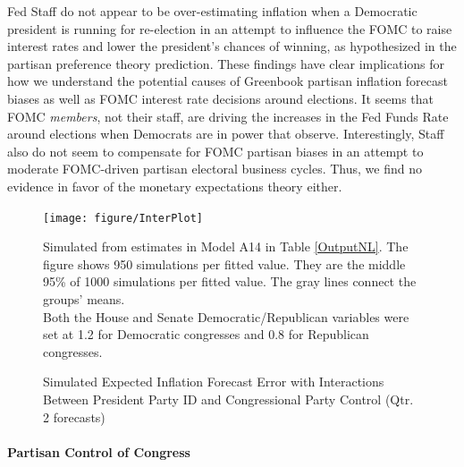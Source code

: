\documentclass[a4paper]{article}
\begin{document}
Fed Staff do not appear to be over-estimating inflation when a Democratic president is running for re-election in an attempt to influence the FOMC to raise interest rates and lower the president's chances of winning, as hypothesized in the partisan preference theory prediction. These findings have clear implications for how we understand the potential causes of Greenbook partisan inflation forecast biases as well as FOMC interest rate decisions around elections. It seems that FOMC \emph{members}, not their staff, are driving the increases in the Fed Funds Rate around elections when Democrats are in power that \cite{Clark2012} observe. Interestingly, Staff also do not seem to compensate for FOMC partisan biases in an attempt to moderate FOMC-driven partisan electoral business cycles. Thus, we find no evidence in favor of the monetary expectations theory either.

\begin{figure}[t]
    \caption{Simulated Expected Inflation Forecast Error with Interactions Between President Party ID and Congressional Party Control (Qtr. 2 forecasts)}
    \label{InterPlot}
    \begin{center}

\begin{knitrout}
\color{fgcolor}

{\centering \texttt{[image: figure/InterPlot]} 

}



\end{knitrout}


    \end{center}
    \begin{singlespace}
        {\scriptsize{Simulated from estimates in Model A14 in Table \ref{OutputNL}. The figure shows 950 simulations per fitted value. They are the middle 95\% of 1000 simulations per fitted value. The gray lines connect the groups' means.  \\ Both the House and Senate Democratic/Republican variables were set at 1.2 for Democratic congresses and 0.8 for Republican congresses.}}
    \end{singlespace}
\end{figure}

\paragraph{Partisan Control of Congress}
\end{document}
